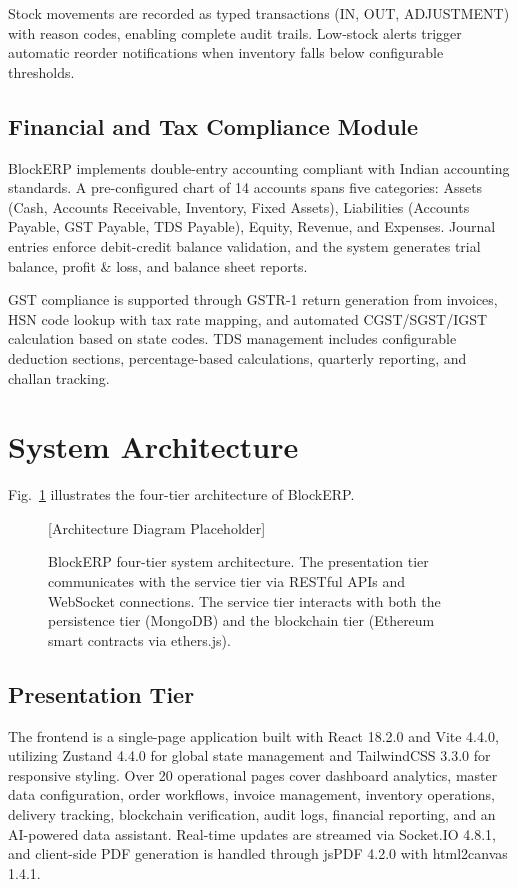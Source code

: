 \documentclass[conference]{IEEEtran}
\begin{document}
Stock movements are recorded as typed transactions (IN, OUT, ADJUSTMENT) with reason codes, enabling complete audit trails. Low-stock alerts trigger automatic reorder notifications when inventory falls below configurable thresholds.

\subsection{Financial and Tax Compliance Module}
BlockERP implements double-entry accounting compliant with Indian accounting standards. A pre-configured chart of 14 accounts spans five categories: Assets (Cash, Accounts Receivable, Inventory, Fixed Assets), Liabilities (Accounts Payable, GST Payable, TDS Payable), Equity, Revenue, and Expenses. Journal entries enforce debit-credit balance validation, and the system generates trial balance, profit \& loss, and balance sheet reports.

GST compliance is supported through GSTR-1 return generation from invoices, HSN code lookup with tax rate mapping, and automated CGST/SGST/IGST calculation based on state codes. TDS management includes configurable deduction sections, percentage-based calculations, quarterly reporting, and challan tracking.

\section{System Architecture}

Fig.~\ref{fig_arch} illustrates the four-tier architecture of BlockERP.

\begin{figure}[htbp]
\centerline{[Architecture Diagram Placeholder]}
\caption{BlockERP four-tier system architecture. The presentation tier communicates with the service tier via RESTful APIs and WebSocket connections. The service tier interacts with both the persistence tier (MongoDB) and the blockchain tier (Ethereum smart contracts via ethers.js).}
\label{fig_arch}
\end{figure}

\subsection{Presentation Tier}
The frontend is a single-page application built with React 18.2.0 and Vite 4.4.0, utilizing Zustand 4.4.0 for global state management and TailwindCSS 3.3.0 for responsive styling. Over 20 operational pages cover dashboard analytics, master data configuration, order workflows, invoice management, inventory operations, delivery tracking, blockchain verification, audit logs, financial reporting, and an AI-powered data assistant. Real-time updates are streamed via Socket.IO 4.8.1, and client-side PDF generation is handled through jsPDF 4.2.0 with html2canvas 1.4.1.
\end{document}

